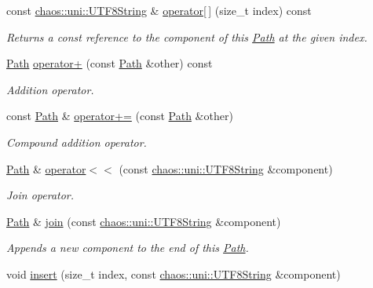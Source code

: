 \begin{DoxyCompactItemize}
const \hyperlink{classchaos_1_1uni_1_1_u_t_f8_string}{chaos\+::uni\+::\+U\+T\+F8\+String} \& \hyperlink{classchaos_1_1io_1_1sys_1_1_path_aa3ee2fea4946e94c9bdb692bdffed522}{operator\mbox{[}$\,$\mbox{]}} (size\+\_\+t index) const 
\begin{DoxyCompactList}\small\item\em Returns a const reference to the component of this \hyperlink{classchaos_1_1io_1_1sys_1_1_path}{Path} at the given index. \end{DoxyCompactList}\item 
\hyperlink{classchaos_1_1io_1_1sys_1_1_path}{Path} \hyperlink{classchaos_1_1io_1_1sys_1_1_path_a5e769fd87717e15f0580e9aacbc0a418}{operator+} (const \hyperlink{classchaos_1_1io_1_1sys_1_1_path}{Path} \&other) const 
\begin{DoxyCompactList}\small\item\em Addition operator. \end{DoxyCompactList}\item 
const \hyperlink{classchaos_1_1io_1_1sys_1_1_path}{Path} \& \hyperlink{classchaos_1_1io_1_1sys_1_1_path_a92a616d9f16047d8933020bab54ed494}{operator+=} (const \hyperlink{classchaos_1_1io_1_1sys_1_1_path}{Path} \&other)
\begin{DoxyCompactList}\small\item\em Compound addition operator. \end{DoxyCompactList}\item 
\hyperlink{classchaos_1_1io_1_1sys_1_1_path}{Path} \& \hyperlink{classchaos_1_1io_1_1sys_1_1_path_a9b3f24e1f3bcb8e989c4b21d70d0a052}{operator$<$$<$} (const \hyperlink{classchaos_1_1uni_1_1_u_t_f8_string}{chaos\+::uni\+::\+U\+T\+F8\+String} \&component)
\begin{DoxyCompactList}\small\item\em Join operator. \end{DoxyCompactList}\item 
\hyperlink{classchaos_1_1io_1_1sys_1_1_path}{Path} \& \hyperlink{classchaos_1_1io_1_1sys_1_1_path_a8fcd75bd349c4c6d1286f6549e34de8c}{join} (const \hyperlink{classchaos_1_1uni_1_1_u_t_f8_string}{chaos\+::uni\+::\+U\+T\+F8\+String} \&component)
\begin{DoxyCompactList}\small\item\em Appends a new component to the end of this \hyperlink{classchaos_1_1io_1_1sys_1_1_path}{Path}. \end{DoxyCompactList}\item 
void \hyperlink{classchaos_1_1io_1_1sys_1_1_path_a7dc2fc570f8475ba5147bffb01de7025}{insert} (size\+\_\+t index, const \hyperlink{classchaos_1_1uni_1_1_u_t_f8_string}{chaos\+::uni\+::\+U\+T\+F8\+String} \&component)

\end{DoxyCompactItemize}
